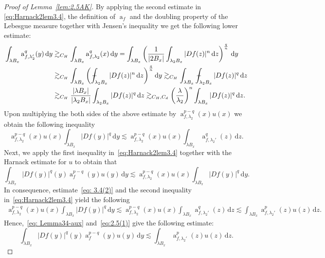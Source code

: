 \documentclass[11pt,a4paper,reqno]{amsart}
\theoremstyle{definition}
\def\vint{\mathop{\mathchoice%
          {\setbox0\hbox{$\displaystyle\intop$}\kern 0.22\wd0%
           \vcenter{\hrule width 0.6\wd0}\kern -0.82\wd0}%
          {\setbox0\hbox{$\textstyle\intop$}\kern 0.2\wd0%
           \vcenter{\hrule width 0.6\wd0}\kern -0.8\wd0}%
          {\setbox0\hbox{$\scriptstyle\intop$}\kern 0.2\wd0%
           \vcenter{\hrule width 0.6\wd0}\kern -0.8\wd0}%
          {\setbox0\hbox{$\scriptscriptstyle\intop$}\kern 0.2\wd0%
           \vcenter{\hrule width 0.6\wd0}\kern -0.8\wd0}}%
          \mathopen{}\int}
\renewcommand{\a}{\operatorname{a}}
\newcommand{\ud}{\mathrm {d}}
\newcommand{\blue}{\color{blau}}
\newcounter{komcounter}
\numberwithin{komcounter}{section}
\newcommand{\komT}[1]{{\bf \blue [\refstepcounter{komcounter}\thekomcounter (by T): #1]}}
\begin{document}
\begin{proof}[Proof of Lemma~\ref{lem:2.5AK}]
By applying the second estimate in \eqref{eq:Harnack2lem3.4}, the definition of $\a_f$ and the doubling property of the Lebesgue measure together with Jensen's inequality we get the following lower estimate:
\begin{align*}
	\int_{\lambda B_x}\a^q_{f,\lambda_2^\prime}(y)\,\ud y &\gtrsim_{C_H}  \int_{\lambda B_x}\a^q_{f,\lambda_2}(x)\,\ud y =\int_{\lambda B_x}\left(\frac{1}{|2B_x|}\int_{\lambda_2 B_x}|Df(z)|^n\,\ud z \right)^\frac{q}{n}\,\ud y \nonumber \\
	&\gtrsim_{C_H}  \int_{\lambda B_x}\left( \vint_{\lambda_2 B_x}|Df(z)|^n\,\ud z \right)^\frac{q}{n}\ud y \gtrsim_{C_H} \int_{\lambda B_x} \vint_{\lambda_2 B_x}|Df(z)|^q\,\ud z \nonumber \\
	& \gtrsim_{C_H}\frac{|\lambda B_x|}{|\lambda_2B_x|} \int_{\lambda_2B_x}|Df(z)|^q\,\ud z \gtrsim_{C_H, C_d} \left(\frac{\lambda}{\lambda_2}\right)^{n}  \int_{\lambda B_x}|Df(z)|^q\,\ud z. %
\end{align*} 
Upon multiplying the both sides of the above estimate by $\a_{f,\lambda_2}^{p-q}(x)u(x)$ we obtain the following inequality
	\begin{equation}\label{eq: 3.4(2)}
		\a_{f,\lambda_2 }^{p-q}(x)u(x)\int_{\lambda B_x}|Df(y)|^q\,\ud y 
		\lesssim \a_{f,\lambda_2}^{p-q}(x)u(x)\int_{\lambda B_x}\a_{f, \lambda_2'}^q(z)\,\ud z.
	\end{equation}
Next, we apply the first inequality in~\eqref{eq:Harnack2lem3.4} together with the Harnack estimate for $u$ to obtain that
\begin{equation}	 
\int_{\lambda B_x}|Df(y)|^q(y)\a_{f}^{p-q}(y)u(y)\,\ud y \lesssim \a_{f,\lambda_2 }^{p-q}(x)u(x)\int_{\lambda B_x}|Df(y)|^q\,\ud y. \label{eq: Lemma34-aux}
\end{equation}
In consequence, estimate~\eqref{eq: 3.4(2)} and the second inequality in~\eqref{eq:Harnack2lem3.4} yield the following 
	\begin{align}
	\a_{f,\lambda_2 }^{p-q}(x)u(x)\int_{\lambda B_x}|Df(y)|^q\,\ud y \lesssim \a_{f,\lambda_2}^{p-q}(x)u(x)\int_{\lambda B_x}\a_{f, \lambda_2'}^q(z)\,\ud z \lesssim \int_{\lambda B_x}\a^p_{f,\lambda_2'}(z)u(z)\,\ud z. \label{eq:2.5(1)}
	\end{align}
Hence,~\eqref{eq: Lemma34-aux} and~\eqref{eq:2.5(1)} give the following estimate:
\begin{equation}\label{eq:2.5(2)}
 \int_{\lambda B_x}|Df(y)|^q(y)\a_{f}^{p-q}(y)u(y)\,\ud y \lesssim \int_{\lambda B_x}\a^p_{f,\lambda_2'}(z)u(z)\,\ud z.

\end{equation}
\end{proof}
\end{document}
